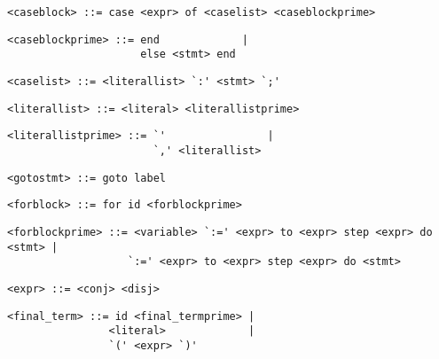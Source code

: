 \begin{footnotesize}
\begin{lstlisting}[frame=single, label={caseblock}, language=pie]
<caseblock> ::= case <expr> of <caselist> <caseblockprime>
\end{lstlisting}

\begin{lstlisting}[frame=single, label={caseblockprime}, language=pie]
<caseblockprime> ::= end             |
                     else <stmt> end
\end{lstlisting}

\begin{lstlisting}[frame=single, label={caselist}, language=pie]
<caselist> ::= <literallist> `:' <stmt> `;'
\end{lstlisting}

\begin{lstlisting}[frame=single, label={literallist}, language=pie]
<literallist> ::= <literal> <literallistprime>
\end{lstlisting}

\begin{lstlisting}[frame=single, label={literallistprime}, language=pie]
<literallistprime> ::= `'                |
                       `,' <literallist>
\end{lstlisting}

\begin{lstlisting}[frame=single, label={gotostmt}, language=pie]
<gotostmt> ::= goto label
\end{lstlisting}

\begin{lstlisting}[frame=single, label={forblock}, language=pie]
<forblock> ::= for id <forblockprime>
\end{lstlisting}

\begin{lstlisting}[frame=single, label={forblockprime}, language=pie]
<forblockprime> ::= <variable> `:=' <expr> to <expr> step <expr> do <stmt> |
                   `:=' <expr> to <expr> step <expr> do <stmt>
\end{lstlisting}

\begin{lstlisting}[frame=single, label={expr}, language=pie]
<expr> ::= <conj> <disj>
\end{lstlisting}

\begin{lstlisting}[frame=single, label={final_term}, language=pie]
<final_term> ::= id <final_termprime> |
                <literal>             |
                `(' <expr> `)'
\end{lstlisting}


\end{footnotesize}
